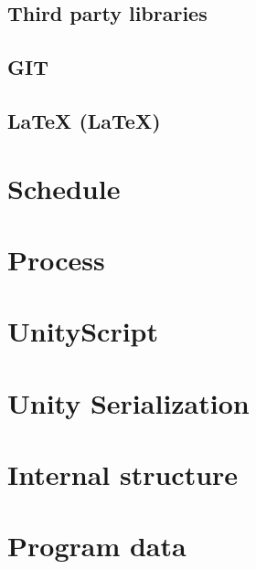 \documentclass[BSP,english,oneside]{classes/gucthesis}
\begin{document}
		\subsection{Third party libraries}
			\label{subsec:third_party_libraries}
			
			
		\subsection{GIT}
			\label{subsec:git}
			

		\subsection{LaTeX (\LaTeX{})}
			\label{subsec:latex}
			


	\section{Schedule}
		\label{sec:schedule}
		

	\section{Process}
		\label{sec:process}
		

	\section{UnityScript}
		\label{sec:UnityScript}
		

	\section{Unity Serialization}
		\label{sec:UnitySerialization}
		

	\section{Internal structure}
		\label{sec:internal_structure}
		

	\section{Program data}
		\label{sec:program_data}
		
\end{document}
